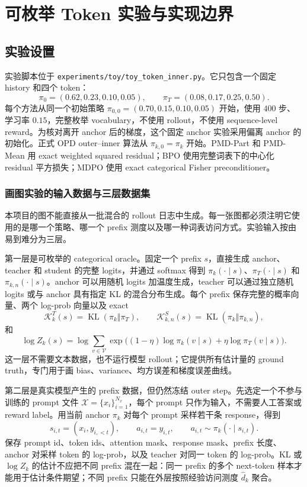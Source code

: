 \chapter{可枚举 Token 实验与实现边界}

\section{实验设置}

实验脚本位于 \texttt{experiments/toy/toy\_token\_inner.py}。它只包含一个固定 history 和四个 token：
\[
 \pi_0=(0.62,0.23,0.10,0.05),
 \qquad
 \pi_T=(0.08,0.17,0.25,0.50).
\]
每个方法从同一个初始策略 $\pi_{0,0}=(0.70,0.15,0.10,0.05)$ 开始，使用 $400$ 步、学习率 $0.15$，完整枚举 vocabulary，不使用 rollout，不使用 sequence-level reward。为核对离开 anchor 后的梯度，这个固定 anchor 实验采用偏离 anchor 的初始化。正式 OPD outer--inner 算法从 $\pi_{k,0}=\pi_k$ 开始。PMD-Part 和 PMD-Mean 用 exact weighted squared residual；BPO 使用完整词表下的中心化 residual 平方损失；MDPO 使用 exact categorical Fisher preconditioner。

\subsection{画图实验的输入数据与三层数据集}

本项目的图不能直接从一批混合的 rollout 日志中生成。每一张图都必须注明它使用的是哪一个策略、哪一个 prefix 测度以及哪一种词表访问方式。实验输入按由易到难分为三层。

第一层是可枚举的 categorical oracle。固定一个 prefix $s$，直接生成 anchor、teacher 和 student 的完整 logits，并通过 softmax 得到 $\pi_k(\cdot\mid s)$、$\pi_T(\cdot\mid s)$ 和 $\pi_{k,n}(\cdot\mid s)$。anchor 可以用随机 logits 加温度生成，teacher 可以通过独立随机 logits 或与 anchor 具有指定 KL 的混合分布生成。每个 prefix 保存完整的概率向量、两个 log-prob 向量以及 exact
\[
\mathcal K_k^T(s)=\operatorname{KL}(\pi_k\Vert\pi_T),\qquad \mathcal K_{k,n}^S(s)=\operatorname{KL}(\pi_k\Vert\pi_{k,n}),
\]
和
\[
\log Z_k(s)=\log\sum_{v\in\mathcal V}\exp\bigl((1-\eta)\log\pi_k(v\mid s)+\eta\log\pi_T(v\mid s)\bigr).
\]
这一层不需要文本数据，也不运行模型 rollout；它提供所有估计量的 ground truth，专门用于画 bias、variance、均方误差和梯度误差曲线。

第二层是真实模型产生的 prefix 数据，但仍然冻结 outer step。先选定一个不参与训练的 prompt 文件 $\mathcal X=\{x_i\}_{i=1}^{N_x}$，每个 prompt 只作为输入，不需要人工答案或 reward label。用当前 anchor $\pi_k$ 对每个 prompt 采样若干条 response，得到
\[
s_{i,t}=(x_i,y_{i,<t}),\qquad a_{i,t}=y_{i,t},\qquad a_{i,t}\sim\pi_k(\cdot\mid s_{i,t}).
\]
保存 prompt id、token ids、attention mask、response mask、prefix 长度、anchor 对采样 token 的 log-prob，以及 teacher 对同一 token 的 log-prob。KL 或 $\log Z_k$ 的估计不应把不同 prefix 混在一起：同一 prefix 的多个 next-token 样本才能用于估计条件期望；不同 prefix 只能在外层按照经验访问测度 $\widehat d_k$ 聚合。


